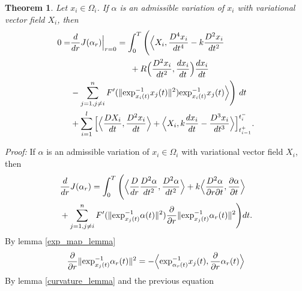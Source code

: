 \documentclass[letterpaper, 10 pt, conference]{ieeeconf}  %
\newtheorem{theorem}{Theorem}[section]
\begin{document}
%
\begin{theorem}\label{theorem1}
Let $x_i \in \Omega_i$. If $\alpha$ is an admissible variation of $x_i$ with variational vector field $X_i$, then 
\begin{align*}
0=&\frac{d}{dr}J(\alpha_r)\Big{|}_{r=0}= \int_{0}^{T} \Bigg( \Big  \langle X_i,\frac{D^4 x_i}{dt^4}- k\frac{D^2x_i}{dt^2} \\& \hspace{2.5cm}+ R \Big(\frac{D^2 x_i}{dt^2}, \frac{dx_i}{dt} \Big)\frac{dx_i}{dt}\\ &- \sum_{j=1 ,j\neq i}^{n} F'(\| \hbox{exp}_{x_i  (t)}^{-1} x_j(t)\|^2)\hbox{exp}^{-1}_{x_i(t)}x_j(t) \Big \rangle \Bigg) \ dt \\ &+ \sum_{i=1}^{l} \Big{[}\Big\langle\frac{DX_{i}}{dt},\frac{D^2x_{i}}{dt} \Big \rangle+\Big\langle X_i, k \frac{dx_i}{dt} - \frac{D^3x_i}{dt^3} \Big \rangle\Big{]}^{t_{i}^{-}}_{t_{i-1}^{+}}.
\end{align*}
\end{theorem}
%
\textit{Proof:} If $\alpha$ is an admissible variation of $x_i \in \Omega_i$ with variational vector field $X_i$, then
\begin{equation*}
\begin{split}
& \frac{d}{dr}J(\alpha_r) = \int_0^T  \Bigg( \Big \langle \frac{D}{dr} \frac{D^2 \alpha}{dt^2}, \frac{D^2 \alpha}{dt^2}\Big \rangle + k\Big \langle\frac{D^2 \alpha}{\partial r \partial t}, \frac{\partial \alpha}{\partial t} \Big \rangle \\ &+  \sum\limits_{j=1, j \neq i}^{n} F'(\| \hbox{exp}^{-1}_{x_{j}(t)}\alpha(t)\|^2)\frac{\partial}{\partial r}\|\hbox{exp}^{-1}_{x_j(t)}\alpha_r(t)\|^2 \Bigg)dt.
\end{split}
\end{equation*}
By lemma \ref{exp_map_lemma}
\begin{equation*}
\begin{split}
\frac{\partial}{\partial r}\|\hbox{exp}^{-1}_{x_j(t)}\alpha_r(t)\|^2 = - \Big \langle \hbox{exp}^{-1}_{\alpha_r(t)}x_j(t), \frac{\partial}{\partial r} \alpha_r(t) \Big \rangle
\end{split}
\end{equation*}
By lemma \ref{curvature_lemma} and the previous equation \\
\end{document}
